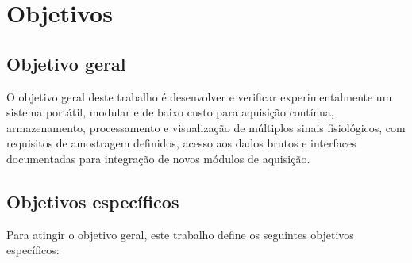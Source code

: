 \documentclass[a4paper,12pt]{fcte}
\begin{document}
\section{Objetivos}

\subsection{Objetivo geral}

O objetivo geral deste trabalho é desenvolver e verificar experimentalmente um sistema portátil, modular e de baixo custo para aquisição contínua, armazenamento, processamento e visualização de múltiplos sinais fisiológicos, com requisitos de amostragem definidos, acesso aos dados brutos e interfaces documentadas para integração de novos módulos de aquisição.

\subsection{Objetivos específicos}

Para atingir o objetivo geral, este trabalho define os seguintes objetivos específicos:
\end{document}

